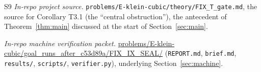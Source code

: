 \documentclass[11pt]{article}
\theoremstyle{plain}
\theoremstyle{definition}
\theoremstyle{remark}
\begin{document}
\begin{thebibliography}{S9}
 \emph{In-repo project source.}
\texttt{problems/E-klein-cubic/theory/FIX\_T\_gate.md}, the source for
Corollary T3.1 (the ``central obstruction''), the antecedent of
Theorem~\ref{thm:main} discussed at the start of
Section~\ref{sec:main}.

 \emph{In-repo machine verification packet.}
\url{problems/E-klein-cubic/goal_runs_after_c53d89a/FIX_IX_SEAL/}
(\texttt{REPORT.md}, \texttt{brief.md}, \texttt{results/},
\texttt{scripts/}, \texttt{verifier.py}), underlying
Section~\ref{sec:machine}.

\end{thebibliography}
\end{document}

